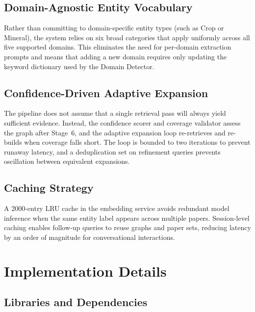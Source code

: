 \documentclass[11pt,a4paper]{article}
\begin{document}
\subsection{Domain-Agnostic Entity Vocabulary}

Rather than committing to domain-specific entity types (such as Crop or
Mineral), the system relies on six broad categories that apply uniformly
across all five supported domains. This eliminates the need for per-domain
extraction prompts and means that adding a new domain requires only updating
the keyword dictionary used by the Domain Detector.

\subsection{Confidence-Driven Adaptive Expansion}

The pipeline does not assume that a single retrieval pass will always yield
sufficient evidence. Instead, the confidence scorer and coverage validator
assess the graph after Stage~6, and the adaptive expansion loop re-retrieves
and re-builds when coverage falls short. The loop is bounded to two
iterations to prevent runaway latency, and a deduplication set on refinement
queries prevents oscillation between equivalent expansions.

\subsection{Caching Strategy}

A 2000-entry LRU cache in the embedding service avoids redundant model
inference when the same entity label appears across multiple papers.
Session-level caching enables follow-up queries to reuse graphs and paper
sets, reducing latency by an order of magnitude for conversational
interactions.

\section{Implementation Details}

\subsection{Libraries and Dependencies}
\end{document}
